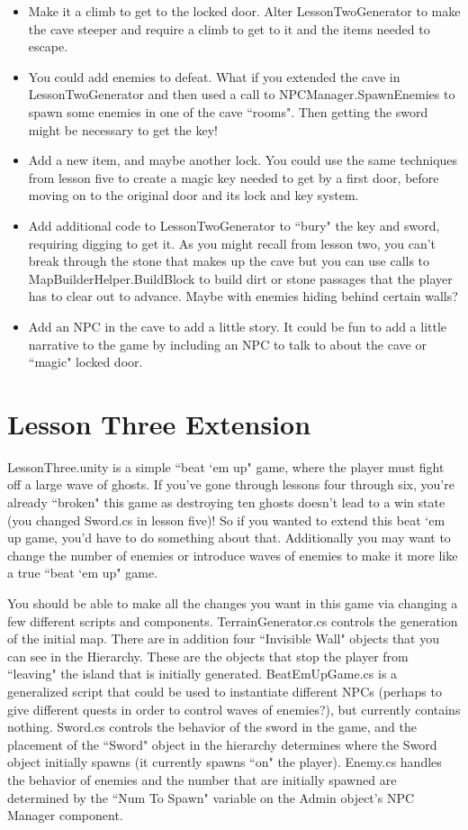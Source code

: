 \documentclass{article}
\begin{document}
\begin{itemize}
  \item Make it a climb to get to the locked door. Alter LessonTwoGenerator to make the cave steeper and require a climb to get to it and the items needed to escape.
  \item You could add enemies to defeat. What if you extended the cave in LessonTwoGenerator and then used a call to NPCManager.SpawnEnemies to spawn some enemies in one of the cave ``rooms". Then getting the sword might be necessary to get the key!
  \item Add a new item, and maybe another lock. You could use the same techniques from lesson five to create a magic key needed to get by a first door, before moving on to the original door and its lock and key system.
  \item Add additional code to LessonTwoGenerator to ``bury" the key and sword, requiring digging to get it. As you might recall from lesson two, you can't break through the stone that makes up the cave but you can use calls to MapBuilderHelper.BuildBlock to build dirt or stone passages that the player has to clear out to advance. Maybe with enemies hiding behind certain walls?
  \item Add an NPC in the cave to add a little story. It could be fun to add a little narrative to the game by including an NPC to talk to about the cave or ``magic" locked door.
\end{itemize}

\section{Lesson Three Extension}

LessonThree.unity is a simple ``beat `em up" game, where the player must fight off a large wave of ghosts. If you've gone through lessons four through six, you're already ``broken" this game as destroying ten ghosts doesn't lead to a win state (you changed Sword.cs in lesson five)! So if you wanted to extend this beat `em up game, you'd have to do something about that. Additionally you may want to change the number of enemies or introduce waves of enemies to make it more like a true ``beat `em up" game.

You should be able to make all the changes you want in this game via changing a few different scripts and components. TerrainGenerator.cs controls the generation of the initial map. There are in addition four ``Invisible Wall" objects that you can see in the Hierarchy. These are the objects that stop the player from ``leaving" the island that is initially generated. BeatEmUpGame.cs is a generalized script that could be used to instantiate different NPCs (perhaps to give different quests in order to control waves of enemies?), but currently contains nothing. Sword.cs controls the behavior of the sword in the game, and the placement of the ``Sword" object in the hierarchy determines where the Sword object initially spawns (it currently spawns ``on" the player). Enemy.cs handles the behavior of enemies and the number that are initially spawned are determined by the ``Num To Spawn" variable on the Admin object's NPC Manager component.
\end{document}
